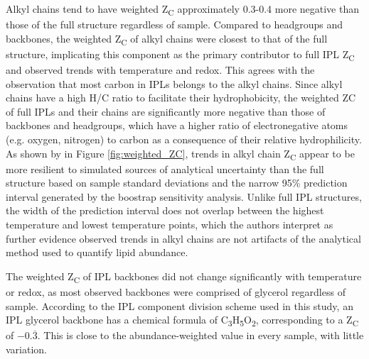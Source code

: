 Alkyl chains tend to have weighted Z\textsubscript{C} approximately 0.3-0.4 more negative than those of the full structure regardless of sample. Compared to headgroups and backbones, the weighted Z\textsubscript{C} of alkyl chains were closest to that of the full structure, implicating this component as the primary contributor to full IPL Z\textsubscript{C} and observed trends with temperature and redox. This agrees with the observation that most carbon in IPLs belongs to the alkyl chains. Since alkyl chains have a high H/C ratio to facilitate their hydrophobicity, the weighted ZC of full IPLs and their chains are significantly more negative than those of backbones and headgroups, which have a higher ratio of electronegative atoms (e.g. oxygen, nitrogen) to carbon as a consequence of their relative hydrophilicity. As shown by in Figure \ref{fig:weighted_ZC}, trends in alkyl chain Z\textsubscript{C} appear to be more resilient to simulated sources of analytical uncertainty than the full structure based on sample standard deviations and the narrow 95\% prediction interval generated by the boostrap sensitivity analysis. Unlike full IPL structures, the width of the prediction interval does not overlap between the highest temperature and lowest temperature points, which the authors interpret as further evidence observed trends in alkyl chains are not artifacts of the analytical method used to quantify lipid abundance.

The weighted Z\textsubscript{C} of IPL backbones did not change significantly with temperature or redox, as most observed backbones were comprised of glycerol regardless of sample. According to the IPL component division scheme used in this study, an IPL glycerol backbone has a chemical formula of C\textsubscript{3}H\textsubscript{5}O\textsubscript{2}, corresponding to a Z\textsubscript{C} of $-0.\overline{3}$. This is close to the abundance-weighted value in every sample, with little variation.

